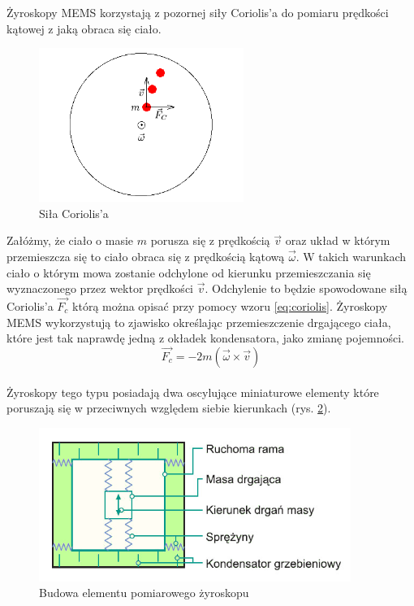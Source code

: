 Żyroskopy MEMS korzystają z pozornej siły Coriolis'a do pomiaru prędkości kątowej
z jaką obraca się ciało. \begin{figure}[!ht]
 \centering \includegraphics[height=50mm]{../images/ch04/coriolis.png}
 \caption{Siła Coriolis'a}
 \label{fig:Coriolis}
\end{figure}
Załóżmy, że ciało o masie $m$ porusza się z prędkością $\vec{v}$ oraz układ w
którym przemieszcza się to ciało obraca się z prędkością kątową $\vec{\omega}$. W
takich warunkach ciało o którym mowa zostanie odchylone od kierunku
przemieszczania się wyznaczonego przez wektor prędkości $\vec{v}$. Odchylenie to
będzie spowodowane siłą Coriolis'a $\vec{F_{c}}$ którą można opisać przy pomocy
wzoru \ref{eq:coriolis}. Żyroskopy MEMS wykorzystują to zjawisko określając
przemieszczenie drgającego ciała, które jest tak naprawdę jedną z okładek
kondensatora, jako zmianę pojemności.
\begin{equation}
  \label{eq:coriolis}
  \vec{F_{c}} = -2m \left(\vec{\omega}\times\vec{v}\right)
\end{equation}
\\
Żyroskopy tego typu posiadają dwa oscylujące miniaturowe elementy które poruszają się w przeciwnych względem siebie kierunkach (rys. \ref{fig:ZyroOsc}). 
\begin{figure}[!ht]
 \centering
 \includegraphics[height=50mm]{../images/ch04/mems_osc.jpg}
 \caption{Budowa elementu pomiarowego żyroskopu\cite{website::elektronikab2b.pl}}
 \label{fig:ZyroOsc}
\end{figure}
